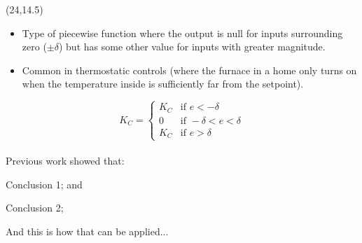 \documentclass{article}
\def\CHead#1{\begin{center}\noindent{\LARGE\color{DarkBlue} #1}\end{center}}
\renewcommand{\LARGE}{\fontsize{43}{54}\selectfont}
\begin{document}
\begin{textblock}{10}(24,14.5)
\CHead{Dead-band}
\begin{itemize}
    \item Type of piecewise function where the output is null for inputs surrounding zero ($\pm \delta$) but has some other value for inputs with greater magnitude.
    \item Common in thermostatic controls (where the furnace in a home only turns on when the temperature inside is sufficiently far from the setpoint).
\end{itemize}

\begin{equation*}
    K_C=
        \begin{cases}
            K_C & \text{if } e < -\delta \\
            0 & \text{if } -\delta < e < \delta \\
            K_C & \text{if } e > \delta 
        \end{cases}
\end{equation*}\\


    Previous work \cite{MyOwnPaper} showed that:
    \begin{itemize*}
        \item Conclusion 1; and 
        \item Conclusion 2;
    \end{itemize*}

And this is how that can be applied...

\end{textblock}

\end{document}
